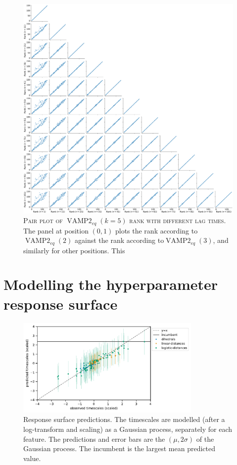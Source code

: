 \documentclass{article}
\begin{document}
\begin{figure}
    \centering
    \includegraphics[width=1.0\textwidth]{figures/vampeq_rank_vs_lag_pairplot_k10.pdf}
    \caption{\textsc{Pair plot of $\operatorname{VAMP2}_{eq}(k=5)$ rank with different lag times.} The panel at position $(0,1)$ plots the rank according to$\operatorname{VAMP2}_{eq}(2)$ against the  rank according to$\operatorname{VAMP2}_{eq}(3)$, and similarly for other positions. This }
    \label{fig:vampeq10_rank_vs_lag_pairplot}
\end{figure}

\section{Modelling the hyperparameter response surface}\label{sec:response_surface_fitting}


\begin{figure}[h]
    \centering
    \includegraphics[width=0.8\textwidth]{figures/response_surface_predictions_ts.pdf}
    \caption{Response surface predictions. The timescales are modelled (after a log-transform and scaling) as a Gaussian process, separately for each feature. The predictions and error bars are the $(\mu, 2\sigma)$ of the Gaussian process. The incumbent is the largest mean predicted value. }
    \label{fig:response_surface}
\end{figure}
\end{document}
